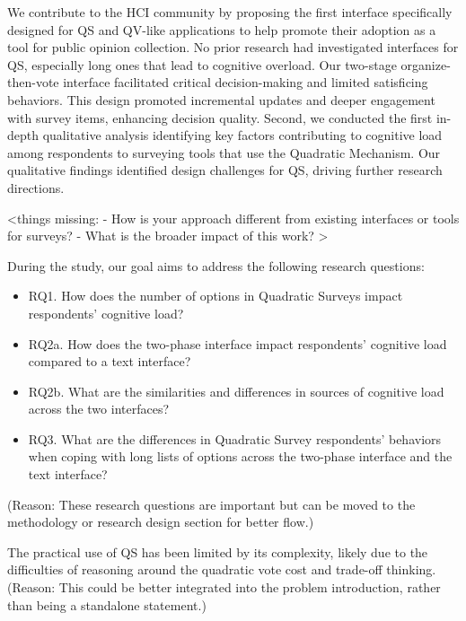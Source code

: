 We contribute to the HCI community by proposing the first interface specifically designed for QS and QV-like applications to help promote their adoption as a tool for public opinion collection. 
No prior research had investigated interfaces for QS, especially long ones that lead to cognitive overload. 
Our two-stage organize-then-vote interface facilitated critical decision-making and limited satisficing behaviors. 
This design promoted incremental updates and deeper engagement with survey items, enhancing decision quality. 
Second, we conducted the first in-depth qualitative analysis identifying key factors contributing to cognitive load among respondents to surveying tools that use the Quadratic Mechanism. 
Our qualitative findings identified design challenges for QS, driving further research directions.

<things missing: 
- How is your approach different from existing interfaces or tools for surveys? 
- What is the broader impact of this work?
>


During the study, our goal aims to address the following research questions:
\begin{itemize}
    \item RQ1. How does the number of options in Quadratic Surveys impact respondents' cognitive load?
    \item RQ2a. How does the two-phase interface impact respondents' cognitive load compared to a text interface?
    \item RQ2b. What are the similarities and differences in sources of cognitive load across the two interfaces?
    \item RQ3. What are the differences in Quadratic Survey respondents' behaviors when coping with long lists of options across the two-phase interface and the text interface?
\end{itemize}
(Reason: These research questions are important but can be moved to the methodology or research design section for better flow.)

The practical use of QS has been limited by its complexity, likely due to the difficulties of reasoning around the quadratic vote cost and trade-off thinking.
(Reason: This could be better integrated into the problem introduction, rather than being a standalone statement.)
